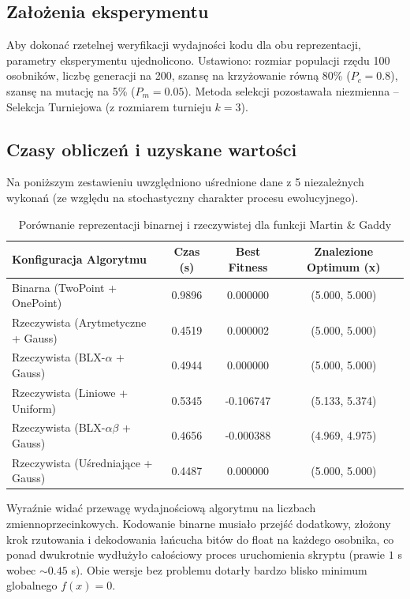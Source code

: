 \documentclass[12pt,a4paper]{article}
\begin{document}
\subsection{Założenia eksperymentu}
Aby dokonać rzetelnej weryfikacji wydajności kodu dla obu reprezentacji, parametry eksperymentu ujednolicono. Ustawiono: rozmiar populacji rzędu 100 osobników, liczbę generacji na 200, szansę na krzyżowanie równą 80\% ($P_c = 0.8$), szansę na mutację na 5\% ($P_m = 0.05$). Metoda selekcji pozostawała niezmienna -- Selekcja Turniejowa (z rozmiarem turnieju $k=3$).

\subsection{Czasy obliczeń i uzyskane wartości}
Na poniższym zestawieniu uwzględniono uśrednione dane z 5 niezależnych wykonań (ze względu na stochastyczny charakter procesu ewolucyjnego).

\begin{table}[H]
    \centering
    \begin{tabular}{@{}lccc@{}}
        \toprule
        \textbf{Konfiguracja Algorytmu} & \textbf{Czas (s)} & \textbf{Best Fitness} & \textbf{Znalezione Optimum (x)} \\ \midrule
        Binarna (TwoPoint + OnePoint) & 0.9896 & 0.000000 & (5.000, 5.000) \\
        Rzeczywista (Arytmetyczne + Gauss) & 0.4519 & 0.000002 & (5.000, 5.000) \\
        Rzeczywista (BLX-$\alpha$ + Gauss) & 0.4944 & 0.000000 & (5.000, 5.000) \\
        Rzeczywista (Liniowe + Uniform) & 0.5345 & -0.106747 & (5.133, 5.374) \\
        Rzeczywista (BLX-$\alpha\beta$ + Gauss) & 0.4656 & -0.000388 & (4.969, 4.975) \\
        Rzeczywista (Uśredniające + Gauss) & 0.4487 & 0.000000 & (5.000, 5.000) \\
        \bottomrule
    \end{tabular}
    \caption{Porównanie reprezentacji binarnej i rzeczywistej dla funkcji Martin \& Gaddy}
    \label{tab:comparison}
\end{table}

Wyraźnie widać przewagę wydajnościową algorytmu na liczbach zmiennoprzecinkowych. Kodowanie binarne musiało przejść dodatkowy, złożony krok rzutowania i dekodowania łańcucha bitów do float na każdego osobnika, co ponad dwukrotnie wydłużyło całościowy proces uruchomienia skryptu (prawie $1$ s wobec $\sim 0.45$ s). Obie wersje bez problemu dotarły bardzo blisko minimum globalnego $f(x)=0$.
\end{document}
